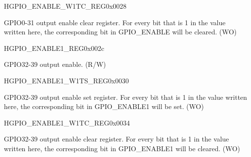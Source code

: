 \begin{register}{H}{GPIO\_ENABLE\_W1TC\_REG}{0x0028}\label{regdesc:GPIOENABLEW1TCREG}
%
\regnewline%
\begin{regdesc}\begin{reglist}
\item [GPIO\_ENABLE\_W1TC\_REG]GPIO0-31 output enable clear register. For every bit that is 1 in the value written here, the corresponding bit in GPIO\_ENABLE will be cleared. (WO)
\end{reglist}\end{regdesc}
\end{register}


\begin{register}{H}{GPIO\_ENABLE1\_REG}{0x002c}\label{regdesc:GPIOENABLE1REG}
%
%
\regnewline%
\begin{regdesc}\begin{reglist}
\item [GPIO\_ENABLE\_DATA]GPIO32-39 output enable. (R/W)
\end{reglist}\end{regdesc}
\end{register}


\begin{register}{H}{GPIO\_ENABLE1\_W1TS\_REG}{0x0030}\label{regdesc:GPIOENABLE1W1TSREG}
%
%
\regnewline%
\begin{regdesc}\begin{reglist}
\item [GPIO\_ENABLE\_DATA]GPIO32-39 output enable set register. For every bit that is 1 in the value written here, the corresponding bit in GPIO\_ENABLE1 will be set. (WO)
\end{reglist}\end{regdesc}
\end{register}


\begin{register}{H}{GPIO\_ENABLE1\_W1TC\_REG}{0x0034}\label{regdesc:GPIOENABLE1W1TCREG}
%
%
\regnewline%
\begin{regdesc}\begin{reglist}
\item [GPIO\_ENABLE\_DATA]GPIO32-39 output enable  clear register. For every bit that is 1 in the value written here, the corresponding bit in GPIO\_ENABLE1 will be cleared. (WO)
\end{reglist}\end{regdesc}
\end{register}


